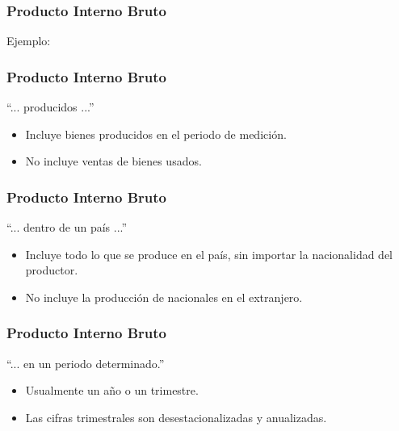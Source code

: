 \documentclass[dvipsnames,table,leqno]{beamer}
\begin{document}
		\begin{frame}
			\frametitle{Producto Interno Bruto}
			Ejemplo:
			\begin{table}[htbp!]
				\centering
			\end{table}
		\end{frame}	

		\begin{frame}
			\frametitle{Producto Interno Bruto}
			``... producidos ...''
			\begin{itemize}
				\item Incluye bienes producidos en el periodo de medición.
				\item No incluye ventas de bienes usados.
			\end{itemize}
		\end{frame}

		\begin{frame}
			\frametitle{Producto Interno Bruto}
			``... dentro de un país ...''
			\begin{itemize}
				\item Incluye todo lo que se produce en el país, sin importar la nacionalidad del productor.
				\item No incluye la producción de nacionales en el extranjero.
			\end{itemize}
		\end{frame}

		\begin{frame}
			\frametitle{Producto Interno Bruto}
			``... en un periodo determinado.''
			\begin{itemize}
				\item Usualmente un año o un trimestre.
				\item Las cifras trimestrales son desestacionalizadas y anualizadas.
			\end{itemize}
		\end{frame}
		
\end{document}
